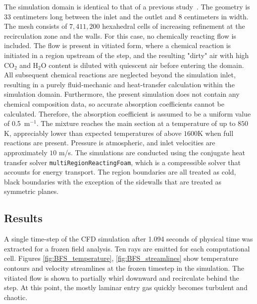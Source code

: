 The simulation domain is identical to that of a previous study~\cite{Toumey2021DevelopmentTransfer}. The geometry is $33$ centimeters long between the inlet and the outlet and $8$ centimeters in width. The mesh consists of $7,411,200$ hexahedral cells of increasing refinement at the recirculation zone and the walls.
For this case, no chemically reacting flow is included. 
The flow is present in vitiated form, where a chemical reaction is initiated in a region upstream of the step, and the resulting "dirty" air with high CO$_2$ and H$_2$O content is diluted with quiescent air before entering the domain. All subsequent chemical reactions are neglected beyond the simulation inlet, resulting in a purely fluid-mechanic and heat-transfer calculation within the simulation domain. Furthermore, the present simulation does not contain any chemical composition data, so accurate absorption coefficients cannot be calculated. Therefore, the absorption coefficient is assumed to be a uniform value of 0.5~m$^{-1}$.
The mixture reaches the main section at a temperature of up to $850$K, appreciably lower than expected temperatures of above $1600$K when full reactions are present. Pressure is atmospheric, and inlet velocities are approximately $10$ m/s.
The simulations are conducted using the conjugate heat transfer solver \texttt{multiRegionReactingFoam}, which is a compressible solver that accounts for energy transport. The region boundaries are all treated as cold, black boundaries with the exception of the sidewalls that are treated as symmetric planes.



\subsection{Results}
A single time-step of the CFD simulation after 1.094 seconds of physical time was extracted for a frozen field analysis. Ten rays are emitted for each computational cell.
Figures \ref{fig:BFS_temperature}, \ref{fig:BFS_streamlines} show temperature contours and velocity streamlines at the frozen timestep in the simulation. The vitiated flow is shown to partially whirl downward and recirculate behind the step. At this point, the mostly laminar entry gas quickly becomes turbulent and chaotic.

